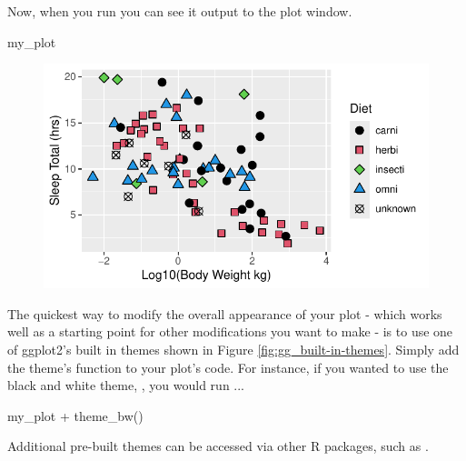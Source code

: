 \vspace{1em}

\noindent
Now, when you run  you can see it output to the plot window.

\begin{inR}
my_plot 
\end{inR}

\vspace{2em}

\begin{figure}[H]
\includegraphics[scale = .75]{graphics/ch2Figs/ggEx_32.pdf}
\end{figure}

The quickest way to modify the overall appearance of your plot - which works well as a starting point for other modifications you want to make - is to use one of ggplot2's built in themes shown in Figure \ref{fig:gg_built-in-themes}.  Simply add the theme's function to your plot's code.  For instance, if you wanted to use the black and white theme, , you would run ...

\begin{inR}
my_plot + theme_bw()
\end{inR}

\vspace{1em}

\noindent
Additional pre-built themes can be accessed via other R packages, such as .

\vspace{2em}

